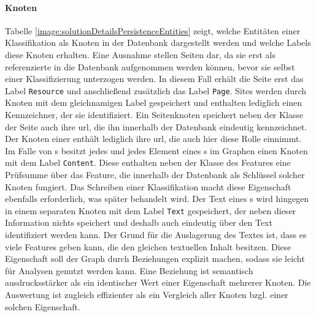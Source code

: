     \paragraph*{Knoten}
    Tabelle \ref{image:solutionDetailsPersistenceEntities} zeigt,
    welche Entitäten einer Klassifikation als Knoten in der Datenbank dargestellt werden
    und welche Labels diese Knoten erhalten.
    Eine Ausnahme stellen Seiten dar,
    da sie erst als referenzierte {\resources} in die Datenbank aufgenommen werden können,
    bevor sie selbst einer Klassifizierung unterzogen werden.
    In diesem Fall erhält die Seite erst das Label \texttt{Resource} und anschließend zusätzlich
    das Label \texttt{Page}.
    Sites werden durch Knoten mit dem gleichnamigen Label gespeichert und enthalten lediglich einen
    Kennzeichner, der sie identifiziert.
    Ein Seitenknoten speichert neben der Klasse der Seite auch ihre \gls{url},
    die ihn innerhalb der Datenbank eindeutig kennzeichnet.
    Der Knoten einer {\resource} enthält lediglich ihre \gls{url}, die auch hier diese Rolle einnimmt.
    Im Falle von {\contentFeature}s besitzt jedes {\scalarFeature} und jedes Element eines {\collectionFeature}s
    im Graphen einen Knoten mit dem Label \texttt{Content}.
    Diese enthalten neben der Klasse des Features eine Prüfsumme über das Feature,
    die innerhalb der Datenbank als Schlüssel solcher Knoten fungiert.
    Das Schreiben einer Klassifikation macht diese Eigenschaft ebenfalls erforderlich,
    was später behandelt wird.
    Der Text eines {\contentFeature}s wird hingegen in einem separaten Knoten mit dem Label \texttt{Text} gespeichert,
    der neben dieser Information nichts speichert und deshalb auch eindeutig über den Text identifiziert werden kann.
    Der Grund für die Auslagerung des Textes ist, dass es viele Features geben kann, die den gleichen textuellen Inhalt besitzen.
    Diese Eigenschaft soll der Graph durch Beziehungen explizit machen,
    sodass sie leicht für Analysen genutzt werden kann.
    Eine Beziehung ist semantisch ausdrucksstärker als ein identischer Wert einer Eigenschaft mehrerer Knoten.
    Die Auswertung ist zugleich effizienter als ein Vergleich aller Knoten bzgl. einer solchen Eigenschaft.


